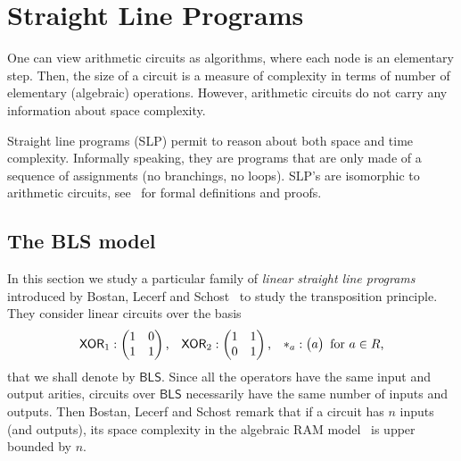 \section{Straight Line Programs}


One can view arithmetic circuits as algorithms, where each node is an
elementary step. Then, the size of a circuit is a measure of
complexity in terms of number of elementary (algebraic)
operations. However, arithmetic circuits do not carry any information
about space complexity.

Straight line programs (SLP)
permit to reason about both space and time complexity. Informally
speaking, they are programs that are only made of a sequence of
assignments (no branchings, no loops).  SLP's are isomorphic to
arithmetic circuits, see~\cite{burgisser+clausen-shokrollahi} for
formal definitions and proofs.

\subsection{The BLS model}
\label{sec:bls-model}
In this section we study a particular family of \emph{linear straight
  line programs} introduced by Bostan, Lecerf and
Schost~\cite{bostan+lecerf+schost:tellegen} to study the transposition
principle. They consider linear circuits over the basis
\begin{equation}
  \label{eq:246}
  \mathsf{XOR}_1 :
  \begin{pmatrix}
    1 & 0\\1 & 1
  \end{pmatrix}
  \text{,}\quad
  \mathsf{XOR}_2 :
  \begin{pmatrix}
    1 & 1\\0 & 1
  \end{pmatrix}
  \text{,}\quad
  *_{a} :
  \begin{pmatrix}
    a
  \end{pmatrix}
  \text{ for $a\in R$,}
\end{equation}
that we shall denote by $\mathsf{BLS}$. Since all the operators have
the same input and output arities, circuits over $\mathsf{BLS}$
necessarily have the same number of inputs and outputs. Then Bostan,
Lecerf and Schost remark that if a circuit has $n$ inputs (and
outputs), its space complexity in the algebraic RAM
model~\cite{kaltofen88:gcd} is upper bounded by $n$.

